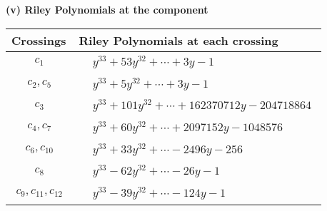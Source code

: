 \documentclass[1p]{elsarticle_modified}
\theoremstyle{definition}
\begin{document}
\flushleft \textbf{(v) Riley Polynomials at the component}\newline \\
\begin{tabular}{m{50pt}|m{274pt}}
Crossings & \hspace{64pt}Riley Polynomials at each crossing \\
\hline $$\begin{aligned}c_{1}\end{aligned}$$&$\begin{aligned}
&y^{33}+53 y^{32}+\cdots+3 y-1
\end{aligned}$\\
\hline $$\begin{aligned}c_{2},c_{5}\end{aligned}$$&$\begin{aligned}
&y^{33}+5 y^{32}+\cdots+3 y-1
\end{aligned}$\\
\hline $$\begin{aligned}c_{3}\end{aligned}$$&$\begin{aligned}
&y^{33}+101 y^{32}+\cdots+162370712 y-204718864
\end{aligned}$\\
\hline $$\begin{aligned}c_{4},c_{7}\end{aligned}$$&$\begin{aligned}
&y^{33}+60 y^{32}+\cdots+2097152 y-1048576
\end{aligned}$\\
\hline $$\begin{aligned}c_{6},c_{10}\end{aligned}$$&$\begin{aligned}
&y^{33}+33 y^{32}+\cdots-2496 y-256
\end{aligned}$\\
\hline $$\begin{aligned}c_{8}\end{aligned}$$&$\begin{aligned}
&y^{33}-62 y^{32}+\cdots-26 y-1
\end{aligned}$\\
\hline $$\begin{aligned}c_{9},c_{11},c_{12}\end{aligned}$$&$\begin{aligned}
&y^{33}-39 y^{32}+\cdots-124 y-1
\end{aligned}$\\
\hline
\end{tabular}\\~\\
\end{document}
